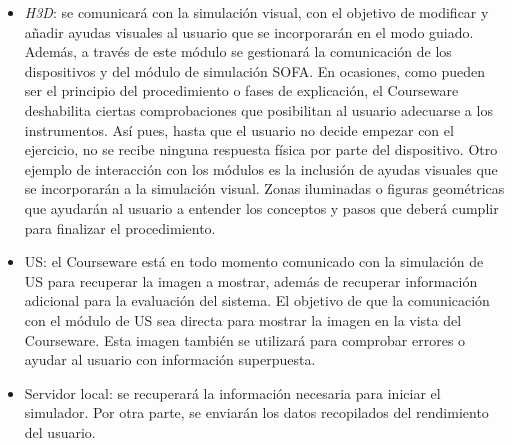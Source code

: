 \begin{itemize}
    
    \item \emph{H3D}: se comunicará con la simulación visual, con el objetivo de modificar y añadir ayudas visuales al usuario que se incorporarán en el modo guiado. Además, a través de este módulo se gestionará la comunicación de los dispositivos y del módulo de simulación \acs{SOFA}. En ocasiones, como pueden ser el principio del procedimiento o fases de explicación, el \ac{Courseware} deshabilita ciertas comprobaciones que posibilitan al usuario adecuarse a los instrumentos. Así pues, hasta que el usuario no decide empezar con el ejercicio, no se recibe ninguna respuesta física por parte del dispositivo. Otro ejemplo de interacción con los módulos es la inclusión de ayudas visuales que se incorporarán a la simulación visual. Zonas iluminadas o figuras geométricas que ayudarán al usuario a entender los conceptos y pasos que deberá cumplir para finalizar el procedimiento. 
    
    \item \ac{US}: el \ac{Courseware} está en todo momento comunicado con la simulación de \ac{US} para recuperar la imagen a mostrar, además de recuperar información adicional para la evaluación del sistema. El objetivo de que la comunicación con el módulo de \ac{US} sea directa para mostrar la imagen en la vista del \ac{Courseware}. Esta imagen también se utilizará para comprobar errores o ayudar al usuario con información superpuesta.
    


\item Servidor local: se recuperará la información necesaria para iniciar el simulador. Por otra parte, se enviarán los datos recopilados del rendimiento del usuario.


\end{itemize}




